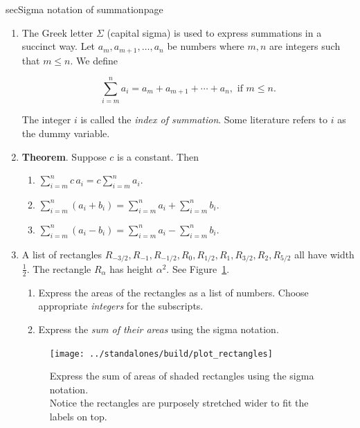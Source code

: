 \documentclass[../main]{subfiles}
\begin{document}
\begin{outline}{sec}{Sigma notation of summation}{page} \label{outline:summation}
  \begin{enumerate}
    \item The Greek letter \(\Sigma\) (capital sigma) is used to express summations in a succinct way. Let \(a_{m}, a_{m+1}, \dots, a_{n}\) be numbers where \(m,n\) are integers such that \(m \le n\).  We define
      \begin{mdframed}[style=simple]
        \[ \sum_{i=m}^{n} a_{i} = a_{m} + a_{m+1} + \cdots + a_{n}, \text{ if } m \le n. \]
      \end{mdframed}
      The integer \(i\) is called the \emph{index of summation}. Some literature refers to \(i\) as the dummy variable.

    \item \textbf{Theorem}. Suppose \(c\) is a constant. Then
      \begin{mdframed}[style=simple]
        \begin{enumerate}[label=(\alph*)]
          \item \(\sum_{i=m}^{n} c \, a_{i} = c \sum_{i=m}^{n} a_{i}\).
          \item \(\sum_{i=m}^{n} (a_{i} + b_{i}) = \sum_{i=m}^{n} a_{i} + \sum_{i=m}^{n} b_{i}\).
          \item \(\sum_{i=m}^{n} (a_{i} - b_{i}) = \sum_{i=m}^{n} a_{i} - \sum_{i=m}^{n} b_{i}\).
        \end{enumerate}
      \end{mdframed}

    \item A list of rectangles \(R_{-3/2}, R_{-1}, R_{-1/2}, R_{0}, R_{1/2}, R_{1}, R_{3/2}, R_{2}, R_{5/2}\) all have width \(\frac{1}{2}\). The rectangle \(R_{\alpha}\) has height \(\alpha^{2}\). See Figure~\ref{fig:rectangles}. 
      \begin{enumerate}
        \item Express the areas of the rectangles as a list of numbers. Choose appropriate \emph{integers} for the subscripts. 
        \item Express the \emph{sum of their areas} using the sigma notation.
      \end{enumerate}
      \begin{figure}[h]  %
        \centering
        \texttt{[image: ../standalones/build/plot\_rectangles]}
        \caption{Express the sum of areas of shaded rectangles using the sigma notation.\\Notice the rectangles are purposely stretched wider to fit the labels on top.}
        \label{fig:rectangles}
      \end{figure}


\end{enumerate}
\end{outline}
\end{document}
